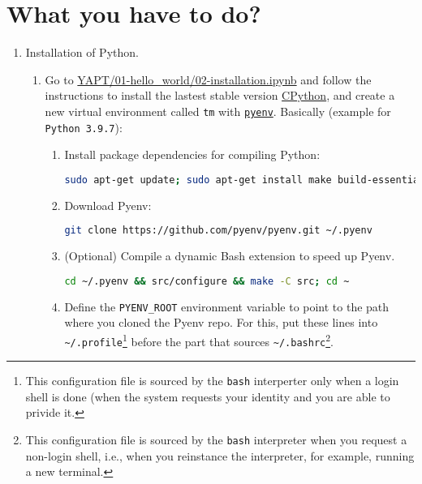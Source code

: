 \section{What you have to do?}

\begin{enumerate}
  
\item Installation of Python.
  
  \begin{enumerate}
    
  \item Go to
    \href{https://github.com/vicente-gonzalez-ruiz/YAPT/blob/master/01-hello_world/02-installation.ipynb}{YAPT/01-hello\_world/02-installation.ipynb}
    \cite{YAPT} and follow the instructions to install the lastest
    stable version
    \href{https://en.wikipedia.org/wiki/CPython}{CPython}, and create
    a new virtual environment called \texttt{tm} with
    \href{https://github.com/pyenv/pyenv}{\texttt{pyenv}}. Basically
    (example for \verb|Python 3.9.7|):

    \begin{enumerate}
    \item Install package dependencies for compiling Python:
      
      \begin{lstlisting}[mathescape=false, language=Bash]
sudo apt-get update; sudo apt-get install make build-essential libssl-dev zlib1g-dev libbz2-dev libreadline-dev libsqlite3-dev wget curl llvm libncursesw5-dev xz-utils tk-dev libxml2-dev libxmlsec1-dev libffi-dev liblzma-dev
\end{lstlisting}

\item Download Pyenv:
  \begin{lstlisting}[mathescape=false, language=Bash]
git clone https://github.com/pyenv/pyenv.git ~/.pyenv
\end{lstlisting}
        
\item (Optional) Compile a dynamic Bash extension to speed up Pyenv.
  \begin{lstlisting}[mathescape=false, language=Bash]
cd ~/.pyenv && src/configure && make -C src; cd ~
\end{lstlisting}

\item Define the \verb|PYENV_ROOT| environment variable to point to
  the path where you cloned the Pyenv repo. For this, put these lines
  into \verb|~/.profile|\footnote{This configuration file is sourced
    by the \texttt{bash} interperter only when a login shell is done
    (when the system requests your identity and you are able to
    privide it.} before the part that sources
  \verb|~/.bashrc|\footnote{This configuration file is sourced by the
    \texttt{bash} interpreter when you request a non-login shell, i.e.,
    when you reinstance the interpreter, for example, running a new
    terminal.}.
        

\end{enumerate}
\end{enumerate}
\end{enumerate}
